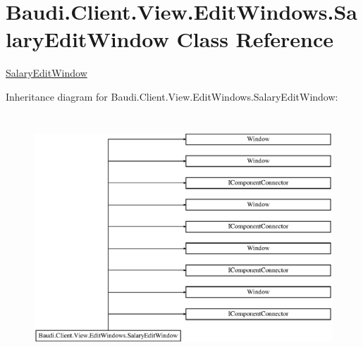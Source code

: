 \hypertarget{class_baudi_1_1_client_1_1_view_1_1_edit_windows_1_1_salary_edit_window}{}\section{Baudi.\+Client.\+View.\+Edit\+Windows.\+Salary\+Edit\+Window Class Reference}
\label{class_baudi_1_1_client_1_1_view_1_1_edit_windows_1_1_salary_edit_window}


\hyperlink{class_baudi_1_1_client_1_1_view_1_1_edit_windows_1_1_salary_edit_window}{Salary\+Edit\+Window}  


Inheritance diagram for Baudi.\+Client.\+View.\+Edit\+Windows.\+Salary\+Edit\+Window\+:\begin{figure}[H]
\begin{center}
\leavevmode
\includegraphics[height=9.302325cm]{class_baudi_1_1_client_1_1_view_1_1_edit_windows_1_1_salary_edit_window}
\end{center}
\end{figure}
